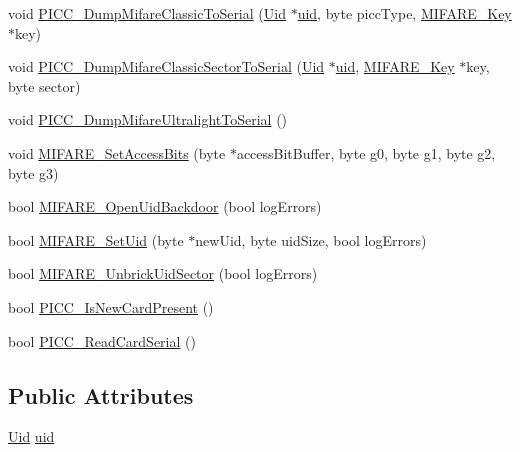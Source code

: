 \begin{DoxyCompactItemize}
\item 
void \hyperlink{class_m_f_r_c522_aa45876e611a99b9b6d8ae2d4117d3976}{P\+I\+C\+C\+\_\+\+Dump\+Mifare\+Classic\+To\+Serial} (\hyperlink{struct_m_f_r_c522_1_1_uid}{Uid} $\ast$\hyperlink{class_m_f_r_c522_ad456545d41962dd7f8bd4210f5618498}{uid}, byte picc\+Type, \hyperlink{struct_m_f_r_c522_1_1_m_i_f_a_r_e___key}{M\+I\+F\+A\+R\+E\+\_\+\+Key} $\ast$key)
\item 
void \hyperlink{class_m_f_r_c522_a20c559f09927a7c5f91295f6158e4342}{P\+I\+C\+C\+\_\+\+Dump\+Mifare\+Classic\+Sector\+To\+Serial} (\hyperlink{struct_m_f_r_c522_1_1_uid}{Uid} $\ast$\hyperlink{class_m_f_r_c522_ad456545d41962dd7f8bd4210f5618498}{uid}, \hyperlink{struct_m_f_r_c522_1_1_m_i_f_a_r_e___key}{M\+I\+F\+A\+R\+E\+\_\+\+Key} $\ast$key, byte sector)
\item 
void \hyperlink{class_m_f_r_c522_ac148d28877dd577606a28e9e7e4b6809}{P\+I\+C\+C\+\_\+\+Dump\+Mifare\+Ultralight\+To\+Serial} ()
\item 
void \hyperlink{class_m_f_r_c522_ab8c712963189654e9bc368be8783e2ab}{M\+I\+F\+A\+R\+E\+\_\+\+Set\+Access\+Bits} (byte $\ast$access\+Bit\+Buffer, byte g0, byte g1, byte g2, byte g3)
\item 
bool \hyperlink{class_m_f_r_c522_a925607adc9382720c222578bd236a9c8}{M\+I\+F\+A\+R\+E\+\_\+\+Open\+Uid\+Backdoor} (bool log\+Errors)
\item 
bool \hyperlink{class_m_f_r_c522_a2bdc18af4952ce99099607c84139b51c}{M\+I\+F\+A\+R\+E\+\_\+\+Set\+Uid} (byte $\ast$new\+Uid, byte uid\+Size, bool log\+Errors)
\item 
bool \hyperlink{class_m_f_r_c522_afcbb15d925cb3bea9f58595111fbca48}{M\+I\+F\+A\+R\+E\+\_\+\+Unbrick\+Uid\+Sector} (bool log\+Errors)
\item 
bool \hyperlink{class_m_f_r_c522_a3adca9d3b455c680ebcde3b74c4e567b}{P\+I\+C\+C\+\_\+\+Is\+New\+Card\+Present} ()
\item 
bool \hyperlink{class_m_f_r_c522_aab1218c71cec9cc17ee3ac8a683df106}{P\+I\+C\+C\+\_\+\+Read\+Card\+Serial} ()
\end{DoxyCompactItemize}
\subsection*{Public Attributes}
\begin{DoxyCompactItemize}
\item 
\hyperlink{struct_m_f_r_c522_1_1_uid}{Uid} \hyperlink{class_m_f_r_c522_ad456545d41962dd7f8bd4210f5618498}{uid}
\end{DoxyCompactItemize}
